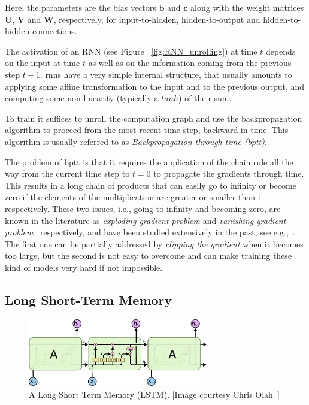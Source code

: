 Here, the parameters are the bias vectors $ \textbf{b} $ and $ \textbf{c} $ along with the weight matrices $\textbf{U}$, $\textbf{V}$ and $\textbf{W}$, respectively, for input-to-hidden, hidden-to-output and hidden-to-hidden connections.

The activation of an RNN (see Figure ~\ref{fig:RNN_unrolling}) at time $t$ depends on the input at time $t$ as well as on the information coming from the previous step $t-1$. \gls{rnn}s have a very simple internal structure, that usually amounts to applying some affine transformation to the input and to the previous output, and computing some non-linearity (typically a $tanh$) of their sum.


To train it suffices to unroll the computation graph and use the backpropagation algorithm to proceed from the most recent time step, backward in time. This algorithm is usually referred to as \emph{Backpropagation through time (\gls{bptt})}.

The problem of \gls{bptt} is that it requires the application of the chain rule all the way from the current time step to $t = 0$ to propagate the gradients through time.  This results in a long chain of products that can easily go to infinity or become zero if the elements of the multiplication are greater or smaller than $1$ respectively. These two issues, i.e., going to infinity and becoming zero, are known in the literature as \emph{exploding gradient problem} and \emph{vanishing gradient problem}~\cite{Hochreiter_01} respectively, and have been studied extensively in the past, see e.g.,~\cite{Bengio_94}. The first one can be partially addressed by \emph{clipping the gradient} when it becomes too large, but the second is not easy to overcome and can make training these kind of models very hard if not impossible.



\subsection{Long Short-Term Memory}
\begin{figure}[t]
	\centering
	\includegraphics[width=0.7\textwidth]{figures/LSTM.pdf}
	\caption[A Long Short Term Memory (LSTM)]
	{A Long Short Term Memory (LSTM). [Image courtesy Chris Olah~\cite{colah_15}]\label{fig:LSTM}}
\end{figure}

